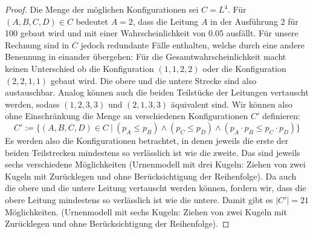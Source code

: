 \documentclass[a4paper]{scrartcl}
\begin{document}
\begin{enumerate}[label=\bfseries\arabic*.]
\begin{proof}
                    Die Menge der möglichen Konfigurationen sei $C = L^4$.%
                    Für $(A, B, C, D) \in C$ bedeutet $A = 2$, dass die 
                    Leitung $A$ in der Ausführung 2 für 100 \EUR gebaut wird und
                    mit einer Wahrscheinlichkeit von \num{0,05} ausfällt.
                    Für unsere Rechnung sind in $C$ jedoch redundante Fälle
                    enthalten, welche durch eine andere Benennung in einander
                    übergehen:
                    Für die Gesamtwahrscheinlichkeit macht keinen Unterschied ob
                    die Konfiguration $(1, 1, 2, 2)$ oder die Konfiguration
                    $(2, 2, 1, 1)$ gebaut wird.
                    Die obere und die untere Strecke sind also austauschbar.
                    Analog können auch die beiden Teilstücke der Leitungen
                    vertauscht werden, sodass $(1, 2, 3, 3)$ und $(2, 1, 3, 3)$
                    äquivalent sind.
                    Wir können also ohne Einschränkung die Menge an
                    verschiedenen Konfigurationen $C'$ definieren:
                    \begin{equation*}
                        C' := \Big\{ 
                            (A, B, C, D) \in C \ |\ 
                            (p_A \leq p_B) \land (p_C \leq p_D) \land
                            (p_A \cdot p_B \leq p_C \cdot p_D)
                        \Big\}
                    \end{equation*}
                    Es werden also die Konfigurationen betrachtet, in denen
                    jeweils die erste der beiden Teilstrecken mindestens so
                    verlässlich ist wie die zweite.
                    Das sind jeweils sechs verschiedene Möglichkeiten
                    (Urnenmodell mit drei Kugeln: Ziehen von zwei Kugeln mit
                    Zurücklegen und ohne Berücksichtigung der Reihenfolge).
                    Da auch die obere und die untere Leitung vertauscht werden
                    können, fordern wir, dass die obere Leitung mindestens so
                    verlässlich ist wie die untere.
                    Damit gibt es $|C'| = 21$ Möglichkeiten.
                    (Urnenmodell mit sechs Kugeln: Ziehen von zwei Kugeln mit
                    Zurücklegen und ohne Berücksichtigung der Reihenfolge).


\end{proof}
\end{enumerate}
\end{document}
